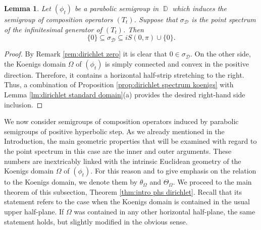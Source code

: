 \documentclass[11pt]{amsart}
\numberwithin{equation}{section}
\newtheorem{lemma}[theorem]{Lemma}
\theoremstyle{definition}
\DeclareMathOperator{\D}{\mathbb{D}}
\begin{document}
	\begin{lemma}\label{lm:phs general}
		Let $(\phi_t)$ be a parabolic semigroup in $\D$ which induces the semigroup of composition operators $(T_t)$. Suppose that $\sigma_\mathcal{D}$ is the point spectrum of the infinitesimal generator of $(T_t)$. Then
		$$\{0\}\subseteq\sigma_\mathcal{D}\subseteq iS(0,\pi)\cup\{0\}.$$
	\end{lemma}
	\begin{proof}
		By Remark \ref{rem:dirichlet zero} it is clear that $0\in\sigma_\mathcal{D}$. On the other side, the Koenigs domain $\Omega$ of $(\phi_t)$ is simply connected and convex in the positive direction. Therefore, it contains a horizontal half-strip stretching to the right. Thus, a combination of Proposition \ref{prop:dirichlet spectrum koenigs} with Lemma \ref{lm:dirichlet standard domain}(a) provides the desired right-hand side inclusion.
	\end{proof}
	
	We now consider semigroups of composition operators induced by parabolic semigroups of positive hyperbolic step. As we already mentioned in the Introduction, the main geometric properties that will be examined with regard to the point spectrum in this case are the inner and outer arguments. These numbers are inextricably linked with the intrinsic Euclidean geometry of the Koenigs domain $\Omega$ of $(\phi_t)$. For this reason and to give emphasis on the relation to the Koenigs domain, we denote them by $\theta_\Omega$ and $\Theta_\Omega$. We proceed to the main theorem of this subsection, Theorem \ref{thm:intro phs dirichlet}. Recall that its statement refers to the case when the Koenigs domain is contained in the usual upper half-plane. If $\Omega$ was contained in any other horizontal half-plane, the same statement holds, but slightly modified in the obvious sense.
	
\end{document}
